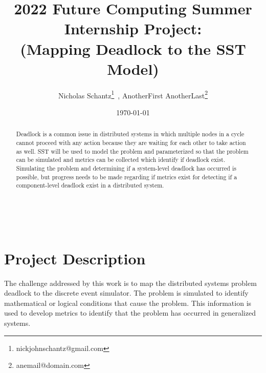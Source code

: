 \documentclass{article}
\begin{document}
%
%
%

    \begin{minipage}[h]{\textwidth}
        \title{2022 Future Computing Summer Internship Project:\\(Mapping Deadlock to the SST Model)}
        \author{Nicholas Schantz\footnote{nickjohnschantz@gmail.com}\ , 
        AnotherFirst AnotherLast\footnote{anemail@domain.com}}
        \date{\today}
            \maketitle
        \begin{abstract}
            Deadlock is a common issue in distributed systems in which multiple nodes in a cycle cannot proceed with any action because they are waiting for each other to take action as well. SST will be used to model the problem and parameterized so that the problem can be simulated and metrics can be collected which identify if deadlock exist. Simulating the problem and determining if a system-level deadlock has occurred is possible, but progress needs to be made regarding if metrics exist for detecting if a component-level deadlock exist in a distributed system.
        \end{abstract}
    \end{minipage}

\ \\


\section{Project Description} %

The challenge addressed by this work is to map the distributed systems problem deadlock to the discrete event simulator. The problem is simulated to identify mathematical or logical conditions that cause the problem. This information is used to develop metrics to identify that the problem has occurred in generalized systems.
\end{document}

